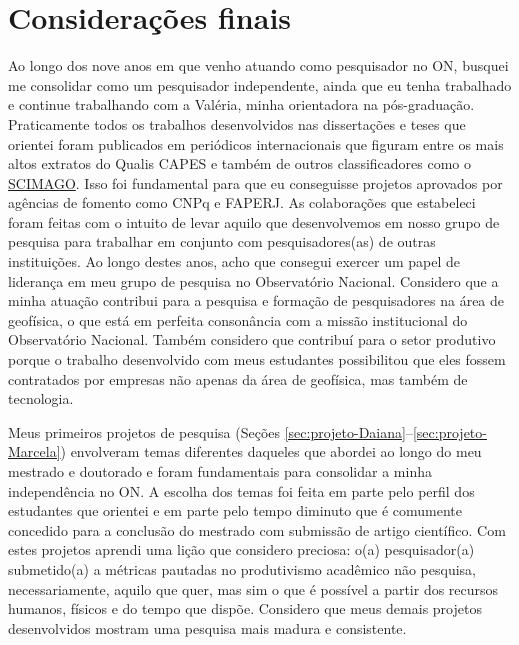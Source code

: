 \renewcommand{\chaptername}{Capítulo}
\chapter{Considerações finais}
\renewcommand{\chaptername}{Considerações finais}
\label{cap:consideracoes-finais}

Ao longo dos nove anos em que venho atuando como pesquisador no ON, 
busquei me consolidar como um pesquisador independente, ainda que eu tenha trabalhado
e continue trabalhando com a Valéria, minha orientadora na pós-graduação.
Praticamente todos os trabalhos desenvolvidos nas dissertações e teses que 
orientei foram publicados em periódicos internacionais que figuram entre 
os mais altos extratos do Qualis CAPES e também de outros classificadores como
o \href{https://www.scimagojr.com/}{SCIMAGO}.
Isso foi fundamental para que eu conseguisse projetos aprovados por agências de fomento
como CNPq e FAPERJ.
As colaborações que estabeleci foram feitas com o intuito de levar aquilo que 
desenvolvemos em nosso grupo de pesquisa para trabalhar em conjunto com 
pesquisadores(as) de outras instituições. 
Ao longo destes anos, acho que consegui exercer um papel de liderança 
em meu grupo de pesquisa no Observatório Nacional.
Considero que a minha atuação contribui para a pesquisa e formação de pesquisadores na 
área de geofísica, o que está em perfeita consonância com a missão institucional do
Observatório Nacional. Também considero que contribuí para o setor produtivo porque
o trabalho desenvolvido com meus estudantes possibilitou que eles fossem contratados
por empresas não apenas da área de geofísica, mas também de tecnologia.

Meus primeiros projetos de pesquisa 
(Seções \ref{sec:projeto-Daiana}--\ref{sec:projeto-Marcela}) envolveram 
temas diferentes daqueles que abordei ao longo do meu mestrado e doutorado e
foram fundamentais para consolidar a minha independência no ON.
A escolha dos temas foi feita em parte pelo perfil dos 
estudantes que orientei e em parte pelo tempo diminuto que é comumente concedido 
para a conclusão do mestrado com submissão de artigo científico. 
Com estes projetos aprendi uma lição que considero preciosa: o(a) pesquisador(a) 
submetido(a) a métricas pautadas no produtivismo acadêmico não pesquisa, necessariamente, 
aquilo que quer, mas sim o que é possível a partir dos recursos humanos, físicos e do
tempo que dispõe. Considero que meus demais projetos desenvolvidos mostram
uma pesquisa mais madura e consistente.

